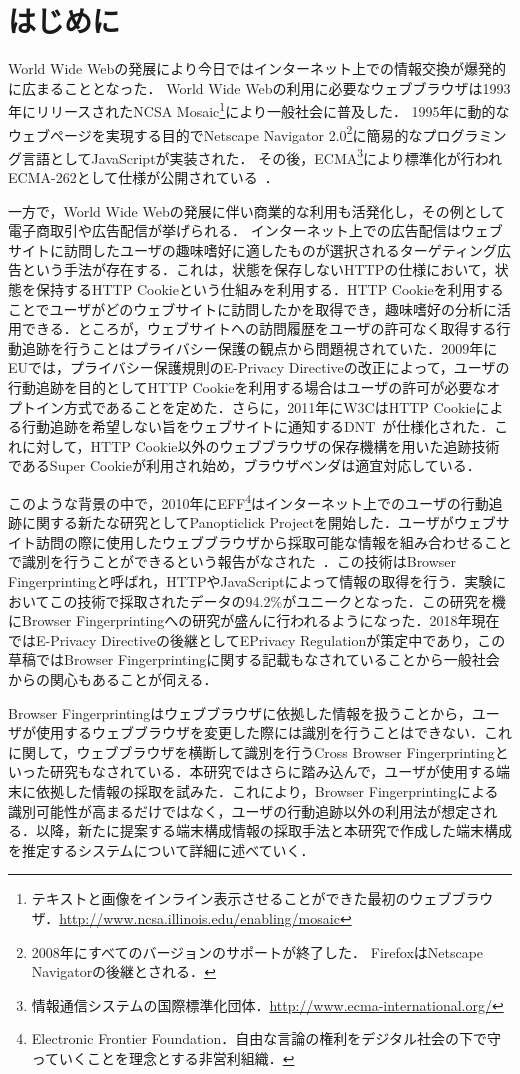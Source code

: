 \section{はじめに}
World Wide Webの発展により今日ではインターネット上での情報交換が爆発的に広まることとなった．
World Wide Webの利用に必要なウェブブラウザは1993年にリリースされたNCSA Mosaic\footnote{テキストと画像をインライン表示させることができた最初のウェブブラウザ．\url{http://www.ncsa.illinois.edu/enabling/mosaic}}により一般社会に普及した．
1995年に動的なウェブページを実現する目的でNetscape Navigator 2.0\footnote{2008年にすべてのバージョンのサポートが終了した．
FirefoxはNetscape Navigatorの後継とされる．}に簡易的なプログラミング言語としてJavaScriptが実装された．
その後，ECMA\footnote{情報通信システムの国際標準化団体．\url{http://www.ecma-international.org/}}により標準化が行われECMA-262として仕様が公開されている~\cite{ecma_262}．

一方で，World Wide Webの発展に伴い商業的な利用も活発化し，その例として電子商取引や広告配信が挙げられる．
インターネット上での広告配信はウェブサイトに訪問したユーザの趣味嗜好に適したものが選択されるターゲティング広告という手法が存在する．これは，状態を保存しないHTTPの仕様において，状態を保持するHTTP Cookieという仕組みを利用する．HTTP Cookieを利用することでユーザがどのウェブサイトに訪問したかを取得でき，趣味嗜好の分析に活用できる．ところが，ウェブサイトへの訪問履歴をユーザの許可なく取得する行動追跡を行うことはプライバシー保護の観点から問題視されていた．2009年にEUでは，プライバシー保護規則のE-Privacy Directiveの改正によって，ユーザの行動追跡を目的としてHTTP Cookieを利用する場合はユーザの許可が必要なオプトイン方式であることを定めた．さらに，2011年にW3CはHTTP Cookieによる行動追跡を希望しない旨をウェブサイトに通知するDNT~\cite{dnt}が仕様化された．これに対して，HTTP Cookie以外のウェブブラウザの保存機構を用いた追跡技術であるSuper Cookieが利用され始め，ブラウザベンダは適宜対応している．

このような背景の中で，2010年にEFF\footnote{Electronic Frontier Foundation．自由な言論の権利をデジタル社会の下で守っていくことを理念とする非営利組織．}はインターネット上でのユーザの行動追跡に関する新たな研究としてPanopticlick Projectを開始した．ユーザがウェブサイト訪問の際に使用したウェブブラウザから採取可能な情報を組み合わせることで識別を行うことができるという報告がなされた~\cite{eckersley2010unique}．この技術はBrowser Fingerprintingと呼ばれ，HTTPやJavaScriptによって情報の取得を行う．実験においてこの技術で採取されたデータの94.2\%がユニークとなった．この研究を機にBrowser Fingerprintingへの研究が盛んに行われるようになった．2018年現在ではE-Privacy Directiveの後継としてEPrivacy Regulationが策定中であり，この草稿ではBrowser Fingerprintingに関する記載もなされていることから一般社会からの関心もあることが伺える．

Browser Fingerprintingはウェブブラウザに依拠した情報を扱うことから，ユーザが使用するウェブブラウザを変更した際には識別を行うことはできない．これに関して，ウェブブラウザを横断して識別を行うCross Browser Fingerprintingといった研究もなされている．本研究ではさらに踏み込んで，ユーザが使用する端末に依拠した情報の採取を試みた．これにより，Browser Fingerprintingによる識別可能性が高まるだけではなく，ユーザの行動追跡以外の利用法が想定される．以降，新たに提案する端末構成情報の採取手法と本研究で作成した端末構成を推定するシステムについて詳細に述べていく．
